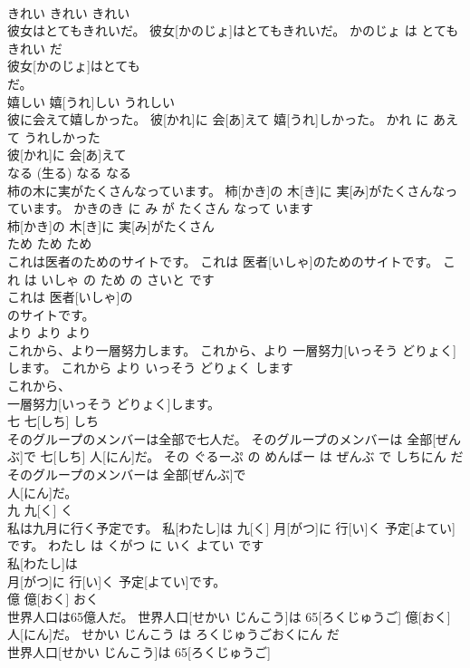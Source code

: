 \documentclass[8pt]{extreport}
\begin{document}
\begin{CJK}{UTF8}{min}
\\	きれい	きれい	きれい	
\\	彼女はとてもきれいだ。	彼女[かのじょ]はとてもきれいだ。	かのじょ は とても きれい だ	
\\	彼女[かのじょ]はとても
\\	だ。		
\\	嬉しい	嬉[うれ]しい	うれしい	
\\	彼に会えて嬉しかった。	彼[かれ]に 会[あ]えて 嬉[うれ]しかった。	かれ に あえて うれしかった	
\\	彼[かれ]に 会[あ]えて
\\	なる (生る)	なる	なる	
\\	柿の木に実がたくさんなっています。	柿[かき]の 木[き]に 実[み]がたくさんなっています。	かきのき に み が たくさん なって います	
\\	柿[かき]の 木[き]に 実[み]がたくさん
\\	ため	ため	ため	
\\	これは医者のためのサイトです。	これは 医者[いしゃ]のためのサイトです。	これ は いしゃ の ため の さいと です	
\\	これは 医者[いしゃ]の
\\	のサイトです。		
\\	より	より	より	
\\	これから、より一層努力します。	これから、より 一層努力[いっそう どりょく]します。	これから より いっそう どりょく します	
\\	これから、
\\	一層努力[いっそう どりょく]します。		
\\	七	七[しち]	しち	
\\	そのグループのメンバーは全部で七人だ。	そのグループのメンバーは 全部[ぜんぶ]で 七[しち] 人[にん]だ。	その ぐるーぷ の めんばー は ぜんぶ で しちにん だ	
\\	そのグループのメンバーは 全部[ぜんぶ]で
\\	人[にん]だ。		
\\	九	九[く]	く	
\\	私は九月に行く予定です。	私[わたし]は 九[く] 月[がつ]に 行[い]く 予定[よてい]です。	わたし は くがつ に いく よてい です	
\\	私[わたし]は
\\	月[がつ]に 行[い]く 予定[よてい]です。		
\\	億	億[おく]	おく	
\\	世界人口は65億人だ。	世界人口[せかい じんこう]は 65[ろくじゅうご] 億[おく] 人[にん]だ。	せかい じんこう は ろくじゅうごおくにん だ	
\\	世界人口[せかい じんこう]は 65[ろくじゅうご]

\end{CJK}
\end{document}
